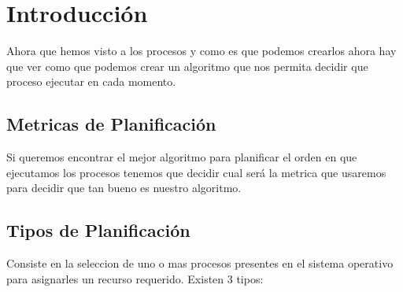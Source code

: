 \documentclass[12pt, fleqn]{report}                             %
\begin{document}
        \clearpage
        \section{Introducción}

            Ahora que hemos visto a los procesos y como es que podemos crearlos ahora hay que ver como 
            que podemos crear un algoritmo que nos permita decidir que proceso ejecutar en cada
            momento.


            \subsection{Metricas de Planificación}

                Si queremos encontrar el mejor algoritmo para planificar el orden en que ejecutamos
                los procesos tenemos que decidir cual será la metrica que usaremos para decidir que 
                tan bueno es nuestro algoritmo.

                

            \subsection{Tipos de Planificación}

                Consiste en la seleccion de uno o mas procesos presentes en el sistema operativo para asignarles
                un recurso requerido. Existen 3 tipos:
\end{document}
